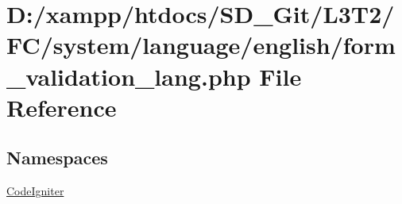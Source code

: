 \hypertarget{form__validation__lang_8php}{}\section{D\+:/xampp/htdocs/\+S\+D\+\_\+\+Git/\+L3\+T2/\+F\+C/system/language/english/form\+\_\+validation\+\_\+lang.php File Reference}
\label{form__validation__lang_8php}
\subsection*{Namespaces}
\begin{DoxyCompactItemize}
\item 
 \hyperlink{namespace_code_igniter}{Code\+Igniter}
\end{DoxyCompactItemize}
